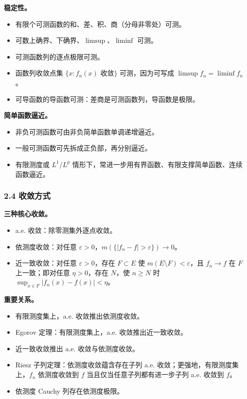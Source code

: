 \documentclass[
UTF8]{ctexart}
\providecommand{\tightlist}{%
\setlength{\itemsep}{0pt}\setlength{\parskip}{0pt}}
\begin{document}
\textbf{稳定性。}

\begin{itemize}
    \tightlist
  \item
    有限个可测函数的和、差、积、商（分母非零处）可测。
  \item
    可数上确界、下确界、\(\limsup\)、\(\liminf\) 可测。
  \item
    可测函数列的逐点极限可测。
  \item
    函数列收敛点集 \(\{x: f_n(x)\text{ 收敛}\}\) 可测，因为可写成
    \(\limsup f_n=\liminf f_n\)。
  \item
    可导函数的导函数可测：差商是可测函数列，导函数是极限。
\end{itemize}

\textbf{简单函数逼近。}

\begin{itemize}
    \tightlist
  \item
    非负可测函数可由非负简单函数单调递增逼近。
  \item
    一般可测函数可先拆成正负部，再分别逼近。
  \item
    有限测度或 \(L^1/L^p\)
    情形下，常进一步用有界函数、有限支撑简单函数、连续函数逼近。
\end{itemize}

\subsubsection{2.4 收敛方式}\label{ux6536ux655bux65b9ux5f0f}

\textbf{三种核心收敛。}

\begin{itemize}
    \tightlist
  \item
    a.e. 收敛：除零测集外逐点收敛。
  \item
    依测度收敛：对任意
    \(\varepsilon>0\)，\(m(\{|f_n-f|>\varepsilon\})\to0\)。
  \item
    近一致收敛：对任意 \(\varepsilon>0\)，存在 \(F\subset E\) 使
    \(m(E\setminus F)<\varepsilon\)，且 \(f_n\to f\) 在 \(F\) 上一致；即对任意
    \(\eta>0\)，存在 \(N\)，使 \(n\ge N\) 时
    \(\sup_{x\in F}|f_n(x)-f(x)|<\eta\)。
\end{itemize}

\textbf{重要关系。}

\begin{itemize}
    \tightlist
  \item
    有限测度集上，a.e. 收敛推出依测度收敛。
  \item
    Egorov 定理：有限测度集上，a.e. 收敛推出近一致收敛。
  \item
    近一致收敛推出 a.e. 收敛与依测度收敛。
  \item
    Riesz 子列定理：依测度收敛蕴含存在子列 a.e.
    收敛；更强地，有限测度集上，\(f_n\) 依测度收敛到 \(f\)
    当且仅当任意子列都有进一步子列 a.e. 收敛到 \(f\)。
  \item
    依测度 Cauchy 列存在依测度极限。
\end{itemize}
\end{document}
